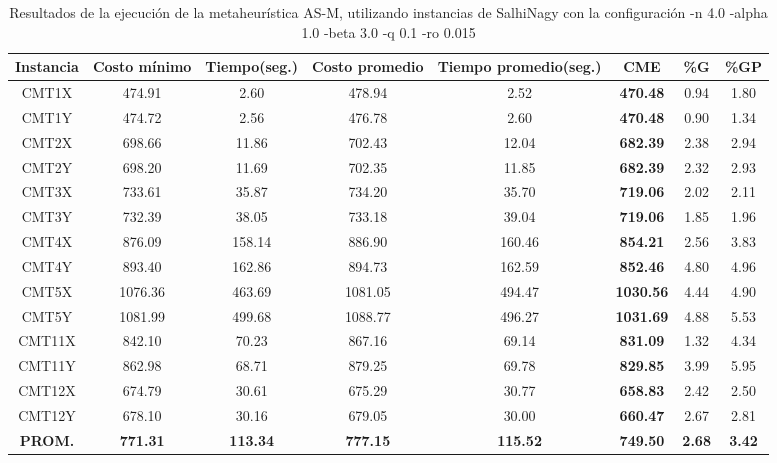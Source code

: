 \begin{table}[h]
\caption{Resultados de la ejecución de la metaheurística AS-M, utilizando instancias de SalhiNagy con la configuración -n 4.0 -alpha 1.0 -beta 3.0 -q 0.1 -ro 0.015}
\centering
\small
\begin{tabular}{c c c c c c c c}
\hline\hline
Instancia & Costo mínimo & Tiempo(seg.) & Costo promedio & Tiempo promedio(seg.) & CME & \%G & \%GP \\ [0.5ex]
\hline
CMT1X & 474.91 & 2.60 & 
478.94 & 2.52 & \bf{470.48} & 
0.94 & 1.80\\CMT1Y & 474.72 & 2.56 & 
476.78 & 2.60 & \bf{470.48} & 
0.90 & 1.34\\CMT2X & 698.66 & 11.86 & 
702.43 & 12.04 & \bf{682.39} & 
2.38 & 2.94\\CMT2Y & 698.20 & 11.69 & 
702.35 & 11.85 & \bf{682.39} & 
2.32 & 2.93\\CMT3X & 733.61 & 35.87 & 
734.20 & 35.70 & \bf{719.06} & 
2.02 & 2.11\\CMT3Y & 732.39 & 38.05 & 
733.18 & 39.04 & \bf{719.06} & 
1.85 & 1.96\\CMT4X & 876.09 & 158.14 & 
886.90 & 160.46 & \bf{854.21} & 
2.56 & 3.83\\CMT4Y & 893.40 & 162.86 & 
894.73 & 162.59 & \bf{852.46} & 
4.80 & 4.96\\CMT5X & 1076.36 & 463.69 & 
1081.05 & 494.47 & \bf{1030.56} & 
4.44 & 4.90\\CMT5Y & 1081.99 & 499.68 & 
1088.77 & 496.27 & \bf{1031.69} & 
4.88 & 5.53\\CMT11X & 842.10 & 70.23 & 
867.16 & 69.14 & \bf{831.09} & 
1.32 & 4.34\\CMT11Y & 862.98 & 68.71 & 
879.25 & 69.78 & \bf{829.85} & 
3.99 & 5.95\\CMT12X & 674.79 & 30.61 & 
675.29 & 30.77 & \bf{658.83} & 
2.42 & 2.50\\CMT12Y & 678.10 & 30.16 & 
679.05 & 30.00 & \bf{660.47} & 
2.67 & 2.81\\\bf{PROM.} & 
\bf{771.31} & \bf{113.34} & \bf{777.15} & \bf{115.52} & \bf{749.50} & \bf{2.68} & \bf{3.42}\\[1ex]\hline
\end{tabular}
\label{table:nonlin}
\end{table}

